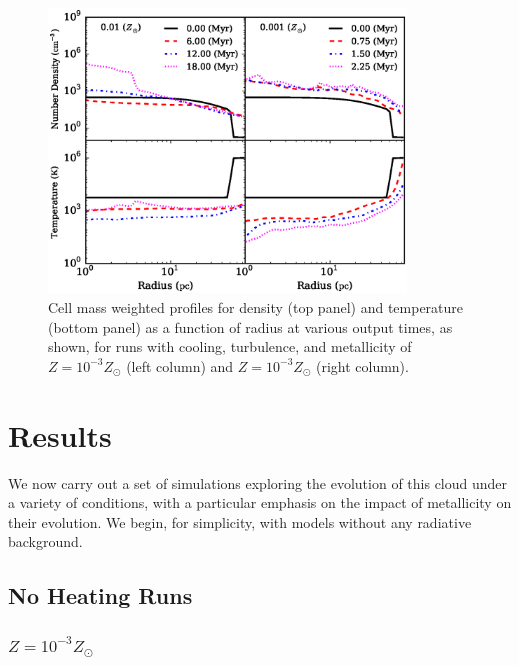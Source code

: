 \documentclass[useAMS,usenatbib]{mn2e}
\begin{document}
% 


\begin{figure}
\begin{center}
\includegraphics[width=9.5cm]{Images/profile_panel}
\end{center}
\caption{\label{fig:profiles} Cell mass weighted profiles for 
density (top panel) and temperature (bottom panel) as a function of radius at various 
output times, as shown, for runs with cooling, turbulence, and metallicity of $Z=10^{-3}Z_\odot$
(left column) and $Z=10^{-3}Z_\odot$ (right column).}
\end{figure}

\section{Results}
\label{sec:results}

We now carry out a set of simulations exploring the evolution of this cloud under a variety of conditions, with a particular emphasis on the impact of metallicity on their evolution.  We begin, for simplicity, with models without any radiative background.


\subsection{No Heating Runs}

\subsubsection{$Z=10^{-3}Z_\odot$}
\end{document}
